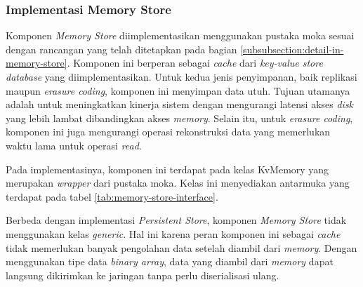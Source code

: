 \subsubsection{Implementasi Memory Store}
\label{subsubsection:implementasi-memory-store}

Komponen \textit{Memory Store} diimplementasikan menggunakan pustaka moka sesuai dengan rancangan yang telah ditetapkan pada bagian \ref{subsubsection:detail-in-memory-store}. Komponen ini berperan sebagai \textit{cache} dari \textit{key-value store database} yang diimplementasikan. Untuk kedua jenis penyimpanan, baik replikasi maupun \textit{erasure coding}, komponen ini menyimpan data utuh. Tujuan utamanya adalah untuk meningkatkan kinerja sistem dengan mengurangi latensi akses \textit{disk} yang lebih lambat dibandingkan akses \textit{memory}. Selain itu, untuk \textit{erasure coding}, komponen ini juga mengurangi operasi rekonstruksi data yang memerlukan waktu lama untuk operasi \textit{read}.

Pada implementasinya, komponen ini terdapat pada kelas KvMemory yang merupakan \textit{wrapper} dari pustaka moka. Kelas ini menyediakan antarmuka yang terdapat pada tabel \ref{tab:memory-store-interface}.

\begin{table}[h]
    \centering
    \caption{Antarmuka Persistent Store}
    \label{tab:memory-store-interface}
\end{table}

Berbeda dengan implementasi \textit{Persistent Store}, komponen \textit{Memory Store} tidak menggunakan kelas \textit{generic}. Hal ini karena peran komponen ini sebagai \textit{cache} tidak memerlukan banyak pengolahan data setelah diambil dari \textit{memory}. Dengan menggunakan tipe data \textit{binary array}, data yang diambil dari \textit{memory} dapat langsung dikirimkan ke jaringan tanpa perlu diserialisasi ulang.

